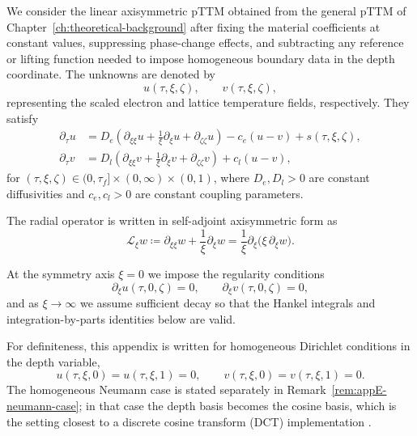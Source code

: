     We consider the linear axisymmetric pTTM obtained from the general pTTM of
    Chapter~\ref{ch:theoretical-background} after fixing the material coefficients
    at constant values, suppressing phase-change effects, and subtracting any
    reference or lifting function needed to impose homogeneous boundary data in the
    depth coordinate. The unknowns are denoted by
    \[
        u(\tau,\xi,\zeta), \qquad v(\tau,\xi,\zeta),
    \]
    representing the scaled electron and lattice temperature fields, respectively.
    They satisfy
    \begin{subequations}\label{eq:appE-linear-axisym-pttm}
        \begin{align}
            \partial_\tau u
             & =
            D_e
            \left(
            \partial_{\xi\xi}u + \frac{1}{\xi}\partial_\xi u + \partial_{\zeta\zeta}u
            \right)
            - c_e (u-v)
            + s(\tau,\xi,\zeta),
            \label{eq:appE-linear-axisym-pttm-e}
            \\
            \partial_\tau v
             & =
            D_l
            \left(
            \partial_{\xi\xi}v + \frac{1}{\xi}\partial_\xi v + \partial_{\zeta\zeta}v
            \right)
            + c_l (u-v),
            \label{eq:appE-linear-axisym-pttm-l}
        \end{align}
    \end{subequations}
    for \((\tau,\xi,\zeta)\in(0,\tau_f]\times(0,\infty)\times(0,1)\), where
\(D_e,D_l>0\) are constant diffusivities and
\(c_e,c_l>0\) are constant coupling parameters.

The radial operator is written in self-adjoint axisymmetric form as
\begin{equation}
    \mathcal{L}_\xi w
    \coloneqq
    \partial_{\xi\xi}w + \frac{1}{\xi}\partial_\xi w
    =
    \frac{1}{\xi}\partial_\xi\!\bigl(\xi\,\partial_\xi w\bigr).
    \label{eq:appE-radial-operator}
\end{equation}

At the symmetry axis \(\xi=0\) we impose the regularity conditions
\begin{equation}
    \partial_\xi u(\tau,0,\zeta)=0,
    \qquad
    \partial_\xi v(\tau,0,\zeta)=0,
    \label{eq:appE-axis-regularity}
\end{equation}
and as \(\xi\to\infty\) we assume sufficient decay so that the Hankel
integrals and integration-by-parts identities below are valid.

For definiteness, this appendix is written for homogeneous Dirichlet conditions
in the depth variable,
\begin{equation}
    u(\tau,\xi,0)=u(\tau,\xi,1)=0,
    \qquad
    v(\tau,\xi,0)=v(\tau,\xi,1)=0.
    \label{eq:appE-depth-dirichlet}
\end{equation}
The homogeneous Neumann case is stated separately in
Remark~\ref{rem:appE-neumann-case}; in that case the depth basis becomes the
cosine basis, which is the setting closest to a discrete cosine transform (DCT) implementation
\cite{Rogers_2012}.

